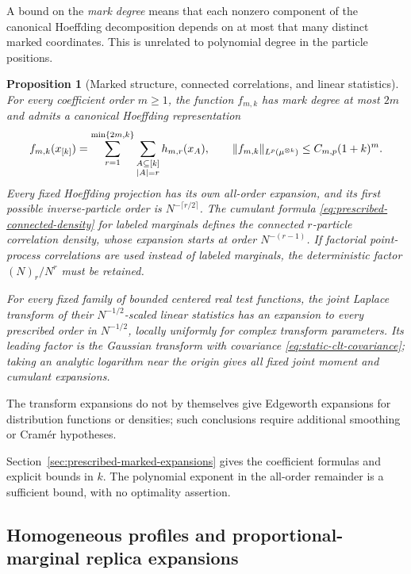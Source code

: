 \documentclass[11pt,reqno]{amsart}
\numberwithin{equation}{section}
\theoremstyle{plain}
\newtheorem{prop}[prop]{Proposition}
\theoremstyle{definition}
\DeclarePairedDelimiter{\norm}{\lVert}{\rVert}
\begin{document}
A bound on the \emph{mark degree} means that each nonzero component of the canonical Hoeffding decomposition depends on at most that many distinct marked coordinates. This is unrelated to polynomial degree in the particle positions.

\begin{prop}[Marked structure, connected correlations, and linear statistics]
\label{prop:prescribed-structural-synopsis}
For every coefficient order $m\geq1$, the function $f_{m,k}$ has mark degree at most $2m$ and admits a canonical Hoeffding representation
\begin{equation}
 f_{m,k}(x_{[k]})
 =\sum_{r=1}^{\min\{2m,k\}}
 \sum_{\substack{A\subseteq[k]\\|A|=r}}h_{m,r}(x_A),
 \qquad
 \norm{f_{m,k}}_{L^p(\mu^{\otimes k})}\leq C_{m,p}(1+k)^m.
 \label{eq:prescribed-mark-degree-synopsis}
\end{equation}
Every fixed Hoeffding projection has its own all-order expansion, and its first possible inverse-particle order is $N^{-\lceil r/2\rceil}$.  The cumulant formula \eqref{eq:prescribed-connected-density} for labeled marginals defines the connected $r$-particle correlation density, whose expansion starts at order $N^{-(r-1)}$.  If factorial point-process correlations are used instead of labeled marginals, the deterministic factor $(N)_r/N^r$ must be retained.

For every fixed family of bounded centered real test functions, the joint Laplace transform of their $N^{-1/2}$-scaled linear statistics has an expansion to every prescribed order in $N^{-1/2}$, locally uniformly for complex transform parameters.  Its leading factor is the Gaussian transform with covariance \eqref{eq:static-clt-covariance}; taking an analytic logarithm near the origin gives all fixed joint moment and cumulant expansions.
\end{prop}

The transform expansions do not by themselves give Edgeworth expansions for distribution functions or densities; such conclusions require additional smoothing or Cram\'er hypotheses.

Section~\ref{sec:prescribed-marked-expansions} gives the coefficient formulas and explicit bounds in $k$. The polynomial exponent in the all-order remainder is a sufficient bound, with no optimality assertion.

\subsection{Homogeneous profiles and proportional-marginal replica expansions}
\label{subsec:replica-results-introduction}
\end{document}
